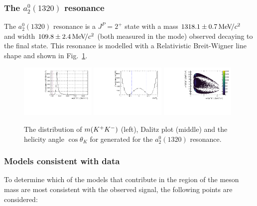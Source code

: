 \subsubsection{The $a_{2}^{0}(1320)$ resonance}
The $a_{2}^{0}(1320)$ resonance is a $J^{P} = 2^{+}$ state with a mass $1318.1\pm0.7{\mathrm{\,Me\kern -0.1em V\!/}c^2}$ and width $109.8\pm2.4{\mathrm{\,Me\kern -0.1em V\!/}c^2}$ (both measured in the \kaon\Kb mode) observed decaying to the \kaon\Kb final state. This resonance is modelled with a Relativistic Breit-Wigner line shape and shown in Fig.~\ref{fig:DsKK_model_a21320}.
\begin{figure}[!h]
   \centering   
   \includegraphics[width=0.32\textwidth]{figs/B2DsPhi/a2_1320_phi_mass.pdf}
   \includegraphics[width=0.32\textwidth]{figs/B2DsPhi/a2_1320_Helicity.pdf}
   \includegraphics[width=0.32\textwidth]{figs/B2DsPhi/a2_1320_Dalitz_plot.pdf}
   \caption{The distribution of $m({{K}^+}{{K}^-})$ (left), Dalitz plot (middle) and the helicity angle $\cos\theta_{K}$ for generated for the $a_{2}^{0}(1320)$ resonance.} 
   \label{fig:DsKK_model_a21320}   
\end{figure}




\subsubsection{Models consistent with data}

To determine which of the models that contribute in the region of the \phiz meson mass are most consistent with the observed signal, the following points are considered: 

